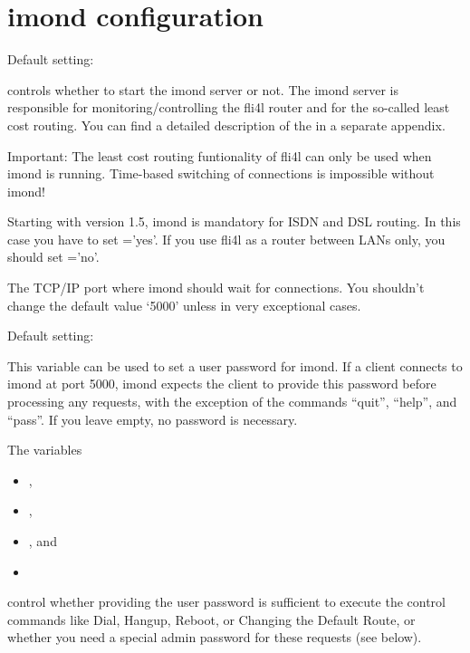 
  \section{imond configuration}

  \begin{description}


      Default setting: 
    
    { controls whether to start the imond server or not.
      The imond server is responsible for monitoring/controlling the fli4l
      router and for the so-called least cost routing. You can
      find a detailed description of the
       in a separate
      appendix.

      Important: The least cost routing funtionality of fli4l can only be used
      when imond is running. Time-based switching of connections is impossible
      without imond!

      Starting with version 1.5, imond is mandatory for ISDN and DSL routing.
      In this case you have to set ='yes'. If you use fli4l
      as a router between LANs only, you should set ='no'.}


    {The TCP/IP port where imond should wait for connections. You shouldn't
      change the default value `5000' unless in very exceptional cases.}



      Default setting: 

    {This variable can be used to set a user password for imond.
      If a client connects to imond at port 5000, imond expects the client to
      provide this password before processing any requests, with the exception
      of the commands ``quit'', ``help'', and ``pass''. If you leave
       empty, no password is necessary.

      The variables
      \begin{itemize}
      \item {},
      \item {},
      \item {}, and
      \item {}
      \end{itemize}
      control whether providing the user password is sufficient to execute the
      control commands like Dial, Hangup, Reboot, or Changing the Default Route, or
      whether you need a special admin password for these requests (see below).}


\end{description}
